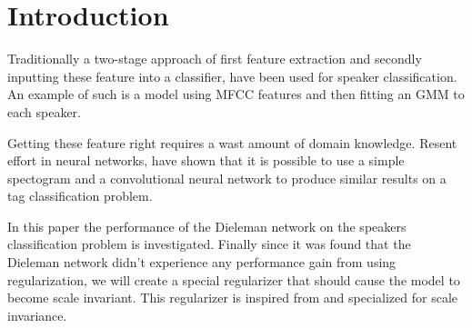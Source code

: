 \section{Introduction}

Traditionally a two-stage approach of first feature extraction and secondly inputting these feature into a classifier, have been used for speaker classification. An example of such is a model using MFCC features and then fitting an GMM to each speaker.

Getting these feature right requires a wast amount of domain knowledge. Resent effort \cite{dieleman} in neural networks, have shown that it is possible to use a simple spectogram and a convolutional neural network to produce similar results on a tag classification problem.

In this paper the performance of the Dieleman \cite{dieleman} network on the speakers classification problem is investigated. Finally since it was found that the Dieleman network didn't experience any performance gain from using regularization\cite{dieleman}, we will create a special regularizer that should cause the model to become scale invariant. This regularizer is inspired from \cite{scale-invariante} and specialized for scale invariance.

